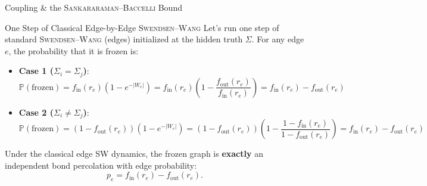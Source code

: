 \documentclass[A4,svgnames,9pt,aspectratio=169]{beamer}
\begin{document}
\begin{frame}{Coupling \& the \textsc{Sankararaman}--\textsc{Baccelli} Bound}
  \begin{block}{One Step of Classical Edge-by-Edge \textsc{Swendsen}--\textsc{Wang}}
    \setlength{\abovedisplayskip}{2pt}
    \setlength{\belowdisplayskip}{2pt}
    Let's run one step of standard \textsc{Swendsen}--\textsc{Wang} (edges) initialized at the hidden truth $\Sigma$.
    For any edge $e$, the probability that it is frozen is:
    \begin{itemize}
      \item \textbf{Case 1 ($\Sigma_i = \Sigma_j$)}:
        \begin{equation*}
            \mathbb{P}(\text{frozen}) = f_{\mathrm{in}}(r_e) \left(1 - e^{-|W_e|}\right) = f_{\mathrm{in}}(r_e) \left(1 - \frac{f_{\mathrm{out}}(r_e)}{f_{\mathrm{in}}(r_e)}\right) = f_{\mathrm{in}}(r_e) - f_{\mathrm{out}}(r_e)
        \end{equation*}
      \item \textbf{Case 2 ($\Sigma_i \neq \Sigma_j$)}:
        \begin{equation*}
            \mathbb{P}(\text{frozen}) = (1 - f_{\mathrm{out}}(r_e)) \left(1 - e^{-|W_e|}\right) = (1 - f_{\mathrm{out}}(r_e)) \left(1 - \frac{1-f_{\mathrm{in}}(r_e)}{1-f_{\mathrm{out}}(r_e)}\right) = f_{\mathrm{in}}(r_e) - f_{\mathrm{out}}(r_e)
        \end{equation*}
    \end{itemize}
  \end{block}

  \begin{corollary}
    Under the classical edge SW dynamics, the frozen graph is \textbf{exactly} an independent bond percolation with edge probability:
    \begin{equation*}
        p_e = f_{\mathrm{in}}(r_e) - f_{\mathrm{out}}(r_e).
    \end{equation*}
  \end{corollary}
\end{frame}
\end{document}
